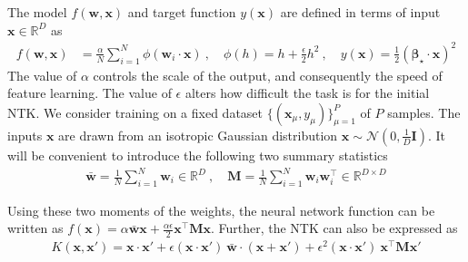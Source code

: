 \documentclass{article} %
\def\w{\bm w}
\def\x{\bm x}
\def\M{\bm M}
\begin{document}
  The model $f(\w, \x)$ and target function $y(\x)$ are defined in terms of input $\x \in \mathbb{R}^{D}$ as
\begin{align}
    f(\w, \x) &= \frac{\alpha}{N} \sum_{i=1}^N  \phi(\w_i \cdot \x) \ , \quad \phi(h) = h + \frac{\epsilon}{2} h^2 
    \ , \quad  y(\x) = \frac{1}{2} (\bm\beta_\star \cdot \x)^2
\end{align}
The value of $\alpha$ controls the scale of the output, and consequently the speed of feature learning. The value of $\epsilon$ alters how difficult the task is for the initial NTK.  We consider training on a fixed dataset $\{ (\x_\mu, y_\mu) \}_{\mu=1}^P$ of $P$ samples. The inputs $\x$ are drawn from an isotropic Gaussian distribution $\x \sim \mathcal{N}(0, \frac{1}{D} \bm I)$.  It will be convenient to introduce the following two summary statistics 
\begin{align}
\bar{\w} = \frac{1}{N} \sum_{i=1}^N  \w_i \in \mathbb{R}^D \ , \quad \bm M = \frac{1}{N} \sum_{i=1}^N  \w_i \w_i^\top \in \mathbb{R}^{D \times D}
\end{align}

Using these two moments of the weights, the neural network function can be written as $f(\x) = \alpha \bar{\w}\x + \frac{\alpha\epsilon}{2} \x^\top \M \x$. 
Further, the NTK can also be expressed as 
\begin{align}
    K(\x,\x') = \x \cdot \x' + \epsilon (\x\cdot \x') \ \bar{\w} \cdot (\x + \x') + \epsilon^2 (\x \cdot \x') \ \x^\top \M \x'
\end{align}
\end{document}
